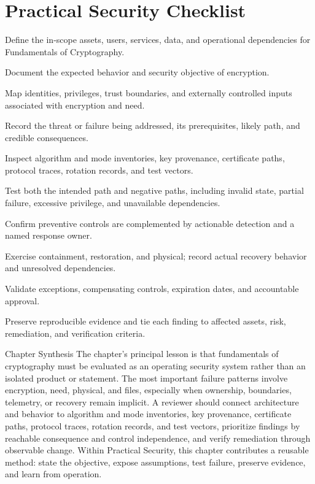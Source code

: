 \documentclass[11pt,letterpaper]{article}
\begin{document}
\section*{Practical Security Checklist}
\begin{CornellChecklist}
\item Define the in-scope assets, users, services, data, and operational dependencies for Fundamentals of Cryptography.
\item Document the expected behavior and security objective of encryption.
\item Map identities, privileges, trust boundaries, and externally controlled inputs associated with encryption and need.
\item Record the threat or failure being addressed, its prerequisites, likely path, and credible consequences.
\item Inspect algorithm and mode inventories, key provenance, certificate paths, protocol traces, rotation records, and test vectors.
\item Test both the intended path and negative paths, including invalid state, partial failure, excessive privilege, and unavailable dependencies.
\item Confirm preventive controls are complemented by actionable detection and a named response owner.
\item Exercise containment, restoration, and physical; record actual recovery behavior and unresolved dependencies.
\item Validate exceptions, compensating controls, expiration dates, and accountable approval.
\item Preserve reproducible evidence and tie each finding to affected assets, risk, remediation, and verification criteria.
\end{CornellChecklist}
\begin{CornellSummaryBox}{Chapter Synthesis}
The chapter's principal lesson is that fundamentals of cryptography must be evaluated as an operating security system rather than an isolated product or statement. The most important failure patterns involve encryption, need, physical, and files, especially when ownership, boundaries, telemetry, or recovery remain implicit. A reviewer should connect architecture and behavior to algorithm and mode inventories, key provenance, certificate paths, protocol traces, rotation records, and test vectors, prioritize findings by reachable consequence and control independence, and verify remediation through observable change. Within Practical Security, this chapter contributes a reusable method: state the objective, expose assumptions, test failure, preserve evidence, and learn from operation.
\end{CornellSummaryBox}
\end{document}
